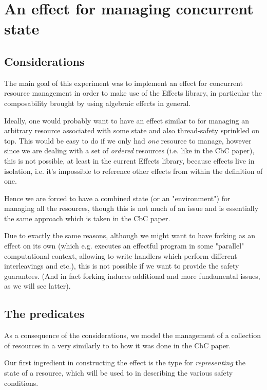 \section{An effect for managing concurrent state}

\subsection{Considerations}

The main goal of this experiment was to implement an effect for concurrent
resource management in order to make use of the Effects library, in particular
the composability brought by using algebraic effects in general.

Ideally, one would probably want to have an effect similar to 
for managing an arbitrary resource associated with some state and also
thread-safety sprinkled on top. This would be easy to do if we only had
\emph{one} resource to manage, however since we are dealing with a set of
\emph{ordered} resources (i.e. like in the CbC paper), this is not possible, at
least in the current Effects library, because effects live in isolation, i.e.
it's impossible to reference other effects from within the definition of one.

Hence we are forced to have a combined state (or an "environment") for managing
all the resources, though this is not much of an issue and is essentially the
same approach which is taken in the CbC paper.

Due to exactly the same reasons, although we might want to have forking as an
effect on its own (which e.g. executes an effectful program in some "parallel"
computational context, allowing to write handlers which perform different
interleavings and etc.), this is not possible if we want to provide the safety
guarantees. (And in fact forking induces additional and more fundamental
issues, as we will see latter).

\subsection{The predicates}

As a consequence of the considerations, we model the management of a collection
of resources in a very similarly to to how it was done in the CbC paper.

Our first ingredient in constructing the effect is the type for
\emph{representing} the state of a resource, which will be used to in
describing the various safety conditions.

